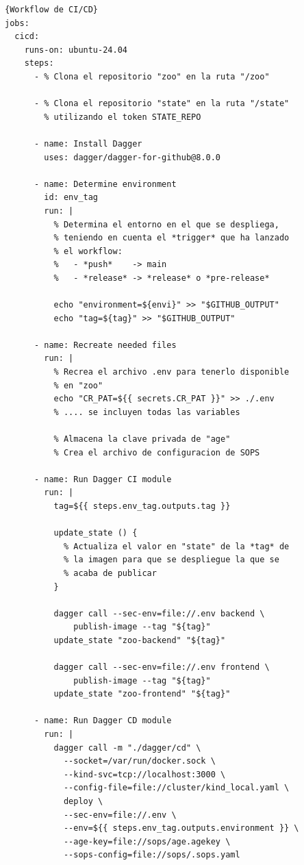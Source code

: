 \begin{itemize}
\begin{lstlisting}[language=workflows,label=lst:workflowcicd]{Workflow de CI/CD}
jobs:
  cicd:
    runs-on: ubuntu-24.04
    steps:
      - % Clona el repositorio "zoo" en la ruta "/zoo"

      - % Clona el repositorio "state" en la ruta "/state"
        % utilizando el token STATE_REPO

      - name: Install Dagger
        uses: dagger/dagger-for-github@8.0.0

      - name: Determine environment
        id: env_tag
        run: |
          % Determina el entorno en el que se despliega,
          % teniendo en cuenta el *trigger* que ha lanzado
          % el workflow:
          %   - *push*    -> main
          %   - *release* -> *release* o *pre-release*

          echo "environment=${envi}" >> "$GITHUB_OUTPUT"
          echo "tag=${tag}" >> "$GITHUB_OUTPUT"

      - name: Recreate needed files
        run: |
          % Recrea el archivo .env para tenerlo disponible
          % en "zoo"
          echo "CR_PAT=${{ secrets.CR_PAT }}" >> ./.env
          % .... se incluyen todas las variables

          % Almacena la clave privada de "age"
          % Crea el archivo de configuracion de SOPS

      - name: Run Dagger CI module
        run: |
          tag=${{ steps.env_tag.outputs.tag }} 

          update_state () {
            % Actualiza el valor en "state" de la *tag* de
            % la imagen para que se despliegue la que se
            % acaba de publicar
          }

          dagger call --sec-env=file://.env backend \
              publish-image --tag "${tag}"
          update_state "zoo-backend" "${tag}"

          dagger call --sec-env=file://.env frontend \
              publish-image --tag "${tag}"
          update_state "zoo-frontend" "${tag}"

      - name: Run Dagger CD module
        run: |
          dagger call -m "./dagger/cd" \
            --socket=/var/run/docker.sock \
            --kind-svc=tcp://localhost:3000 \
            --config-file=file://cluster/kind_local.yaml \
            deploy \
            --sec-env=file://.env \
            --env=${{ steps.env_tag.outputs.environment }} \
            --age-key=file://sops/age.agekey \
            --sops-config=file://sops/.sops.yaml
\end{lstlisting}


\end{itemize}
